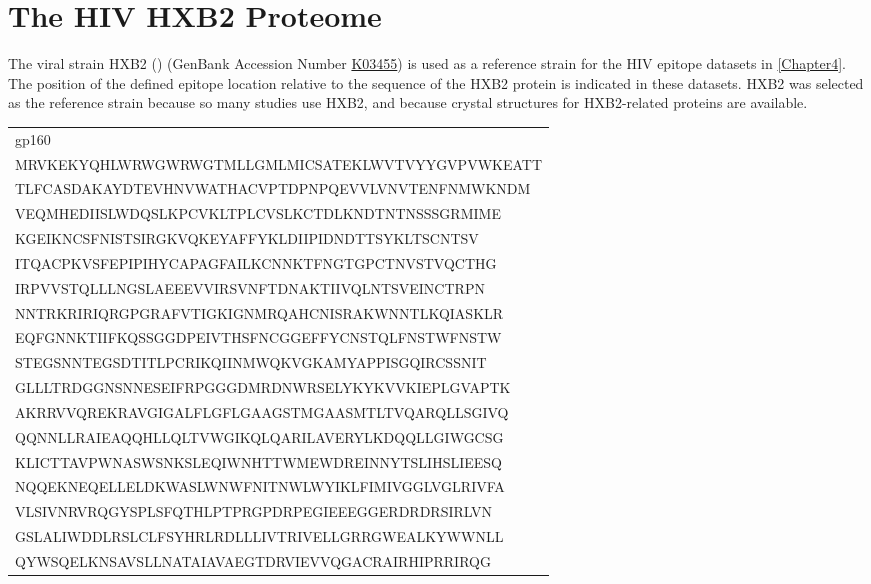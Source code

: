 \clearpage

\section{The HIV HXB2 Proteome}

The viral strain HXB2 () (GenBank Accession Number \href{http://www.ncbi.nlm.nih.gov/nuccore/1906382}{K03455}) is used as a reference strain for the HIV epitope datasets in \cref{Chapter4}. The position of the defined epitope location relative to the sequence of the HXB2 protein is indicated in these datasets. HXB2 was selected as the reference strain because so many studies use HXB2, and because crystal structures for HXB2-related proteins are available.

\begin{table}[htp]
\begin{center}
\begin{tabulary}{\textwidth}{|L|}
\hline
gp160 \bigstrut[t] \\
MRVKEKYQHLWRWGWRWGTMLLGMLMICSATEKLWVTVYYGVPVWKEATT \bigstrut[t] \\
TLFCASDAKAYDTEVHNVWATHACVPTDPNPQEVVLVNVTENFNMWKNDM \\
VEQMHEDIISLWDQSLKPCVKLTPLCVSLKCTDLKNDTNTNSSSGRMIME \\
KGEIKNCSFNISTSIRGKVQKEYAFFYKLDIIPIDNDTTSYKLTSCNTSV \\
ITQACPKVSFEPIPIHYCAPAGFAILKCNNKTFNGTGPCTNVSTVQCTHG \\
IRPVVSTQLLLNGSLAEEEVVIRSVNFTDNAKTIIVQLNTSVEINCTRPN \\
NNTRKRIRIQRGPGRAFVTIGKIGNMRQAHCNISRAKWNNTLKQIASKLR \\
EQFGNNKTIIFKQSSGGDPEIVTHSFNCGGEFFYCNSTQLFNSTWFNSTW \\
STEGSNNTEGSDTITLPCRIKQIINMWQKVGKAMYAPPISGQIRCSSNIT \\
GLLLTRDGGNSNNESEIFRPGGGDMRDNWRSELYKYKVVKIEPLGVAPTK \\
AKRRVVQREKRAVGIGALFLGFLGAAGSTMGAASMTLTVQARQLLSGIVQ \\
QQNNLLRAIEAQQHLLQLTVWGIKQLQARILAVERYLKDQQLLGIWGCSG \\
KLICTTAVPWNASWSNKSLEQIWNHTTWMEWDREINNYTSLIHSLIEESQ \\
NQQEKNEQELLELDKWASLWNWFNITNWLWYIKLFIMIVGGLVGLRIVFA \\
VLSIVNRVRQGYSPLSFQTHLPTPRGPDRPEGIEEEGGERDRDRSIRLVN \\
GSLALIWDDLRSLCLFSYHRLRDLLLIVTRIVELLGRRGWEALKYWWNLL \\
QYWSQELKNSAVSLLNATAIAVAEGTDRVIEVVQGACRAIRHIPRRIRQG \\

\end{tabulary}
\end{center}
\end{table}
